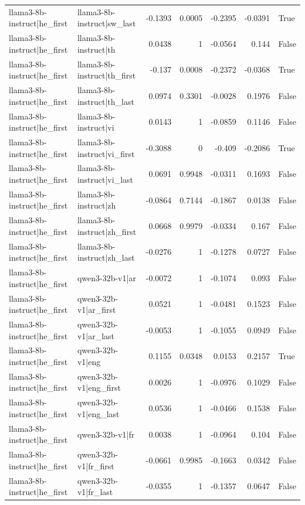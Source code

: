 \begin{table}
\begin{tabular}{l l r r r r l}
llama3-8b-instruct|he_first & llama3-8b-instruct|sw_last & -0.1393 & 0.0005 & -0.2395 & -0.0391 & True \\
llama3-8b-instruct|he_first & llama3-8b-instruct|th & 0.0438 & 1 & -0.0564 & 0.144 & False \\
llama3-8b-instruct|he_first & llama3-8b-instruct|th_first & -0.137 & 0.0008 & -0.2372 & -0.0368 & True \\
llama3-8b-instruct|he_first & llama3-8b-instruct|th_last & 0.0974 & 0.3301 & -0.0028 & 0.1976 & False \\
llama3-8b-instruct|he_first & llama3-8b-instruct|vi & 0.0143 & 1 & -0.0859 & 0.1146 & False \\
llama3-8b-instruct|he_first & llama3-8b-instruct|vi_first & -0.3088 & 0 & -0.409 & -0.2086 & True \\
llama3-8b-instruct|he_first & llama3-8b-instruct|vi_last & 0.0691 & 0.9948 & -0.0311 & 0.1693 & False \\
llama3-8b-instruct|he_first & llama3-8b-instruct|zh & -0.0864 & 0.7144 & -0.1867 & 0.0138 & False \\
llama3-8b-instruct|he_first & llama3-8b-instruct|zh_first & 0.0668 & 0.9979 & -0.0334 & 0.167 & False \\
llama3-8b-instruct|he_first & llama3-8b-instruct|zh_last & -0.0276 & 1 & -0.1278 & 0.0727 & False \\
llama3-8b-instruct|he_first & qwen3-32b-v1|ar & -0.0072 & 1 & -0.1074 & 0.093 & False \\
llama3-8b-instruct|he_first & qwen3-32b-v1|ar_first & 0.0521 & 1 & -0.0481 & 0.1523 & False \\
llama3-8b-instruct|he_first & qwen3-32b-v1|ar_last & -0.0053 & 1 & -0.1055 & 0.0949 & False \\
llama3-8b-instruct|he_first & qwen3-32b-v1|eng & 0.1155 & 0.0348 & 0.0153 & 0.2157 & True \\
llama3-8b-instruct|he_first & qwen3-32b-v1|eng_first & 0.0026 & 1 & -0.0976 & 0.1029 & False \\
llama3-8b-instruct|he_first & qwen3-32b-v1|eng_last & 0.0536 & 1 & -0.0466 & 0.1538 & False \\
llama3-8b-instruct|he_first & qwen3-32b-v1|fr & 0.0038 & 1 & -0.0964 & 0.104 & False \\
llama3-8b-instruct|he_first & qwen3-32b-v1|fr_first & -0.0661 & 0.9985 & -0.1663 & 0.0342 & False \\
llama3-8b-instruct|he_first & qwen3-32b-v1|fr_last & -0.0355 & 1 & -0.1357 & 0.0647 & False \\

\end{tabular}
\end{table}
